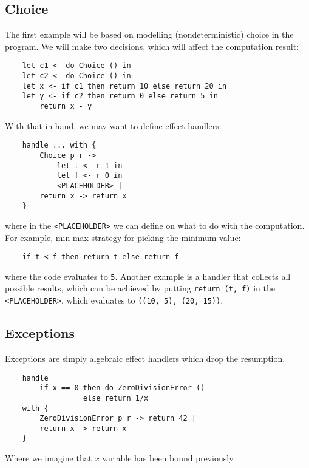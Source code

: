 \documentclass{article}
\theoremstyle{definition}
\theoremstyle{lemma}
\theoremstyle{observation}
\theoremstyle{theorem}
\begin{document}
    \subsection{Choice}
    \label{sec:choice-example}

    The first example will be based on modelling (nondeterministic) choice
    in the program. We will make two decisions, which will affect the computation
    result:

    \begin{verbatim}
    let c1 <- do Choice () in
    let c2 <- do Choice () in
    let x <- if c1 then return 10 else return 20 in
    let y <- if c2 then return 0 else return 5 in
        return x - y
    \end{verbatim}

    With that in hand, we may want to define effect handlers:

    \begin{verbatim}
    handle ... with {
        Choice p r ->
            let t <- r 1 in
            let f <- r 0 in
            <PLACEHOLDER> |
        return x -> return x
    }
    \end{verbatim}

    where in the \verb!<PLACEHOLDER>! we can define on what to do with the
    computation. For example, min-max strategy for picking the minimum value:

    \begin{verbatim}
    if t < f then return t else return f
    \end{verbatim}

    where the code evaluates to \verb!5!. Another example is a handler that
    collects all possible results, which can be achieved by putting
    \verb!return (t, f)! in the \verb!<PLACEHOLDER>!, which evaluates to \verb!((10, 5), (20, 15))!.

    \subsection{Exceptions}

    Exceptions are simply algebraic effect handlers which drop the resumption.

    \begin{verbatim}
    handle
        if x == 0 then do ZeroDivisionError ()
                  else return 1/x
    with {
        ZeroDivisionError p r -> return 42 |
        return x -> return x
    }
    \end{verbatim}
    Where we imagine that $x$ variable has been bound previously.
\end{document}
